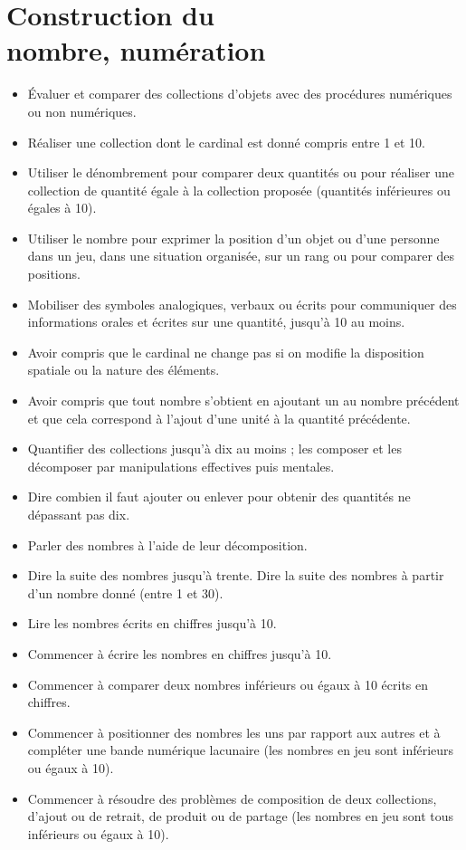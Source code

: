 \chapter{Construction du\\nombre, numération} \label{Num1}


\begin{prerequis}
  {\footnotesize
  \begin{itemize}
      \item Évaluer et comparer des collections d’objets avec des procédures numériques ou non numériques.
      \item Réaliser une collection dont le cardinal est donné compris entre 1 et 10.
      \item Utiliser le dénombrement pour comparer deux quantités ou pour réaliser une collection de quantité égale à la collection proposée (quantités inférieures ou égales à 10).
      \item Utiliser le nombre pour exprimer la position d’un objet ou d’une personne dans un jeu, dans une situation organisée, sur un rang ou pour comparer des positions.
      \item Mobiliser des symboles analogiques, verbaux ou écrits pour communiquer des informations orales et écrites sur une quantité, jusqu'à 10 au moins.
      \item Avoir compris que le cardinal ne change pas si on modifie la disposition spatiale ou la nature des éléments.
      \item Avoir compris que tout nombre s’obtient en ajoutant un au nombre précédent et que cela correspond à l’ajout d’une unité à la quantité précédente.
      \item Quantifier des collections jusqu’à dix au moins ; les composer et les décomposer par manipulations effectives puis mentales.
      \item Dire combien il faut ajouter ou enlever pour obtenir des quantités ne dépassant pas dix.
      \item Parler des nombres à l’aide de leur décomposition.
      \item Dire la suite des nombres jusqu’à trente. Dire la suite des nombres à partir d’un nombre donné (entre 1 et 30).
      \item Lire les nombres écrits en chiffres jusqu’à 10.
      \item Commencer à écrire les nombres en chiffres jusqu’à 10.
      \item Commencer à comparer deux nombres inférieurs ou égaux à 10 écrits en chiffres.
      \item Commencer à positionner des nombres les uns par rapport aux autres et à compléter une bande numérique lacunaire (les nombres en jeu sont inférieurs ou égaux à 10).
      \item Commencer à résoudre des problèmes de composition de deux collections, d’ajout ou de retrait, de produit ou de partage (les nombres en jeu sont tous inférieurs ou égaux à 10).
   \end{itemize}}
\end{prerequis}

